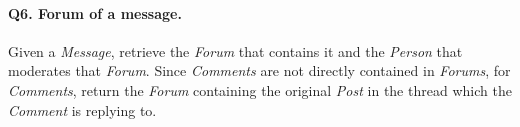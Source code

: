 \paragraph{\textbf{Q6}. Forum of a message.}
Given a \emph{Message}, retrieve the \emph{Forum} that contains it and
the \emph{Person} that moderates that \emph{Forum}. Since
\emph{Comments} are not directly contained in \emph{Forums}, for
\emph{Comments}, return the \emph{Forum} containing the original
\emph{Post} in the thread which the \emph{Comment} is replying to.
